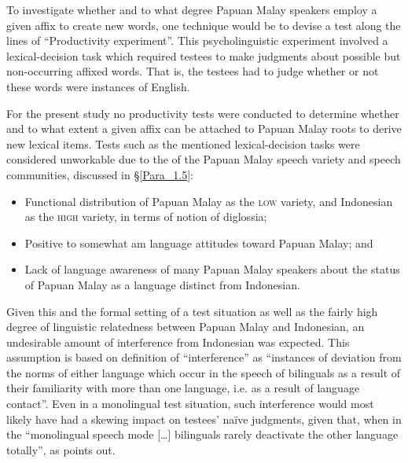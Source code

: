 To investigate whether and to what degree Papuan Malay speakers employ a given affix to create new words, one technique would be to devise a test along the lines of  “Productivity experiment”. This psycholinguistic experiment involved a lexical-decision task which required testees to make judgments about possible but non-occurring affixed words. That is, the testees had to judge whether or not these words were instances of English.



For the present study no productivity tests were conducted to determine whe\-ther and to what extent a given affix can be attached to Papuan Malay roots to derive new lexical items. Tests such as the mentioned lexical-decision tasks were considered unworkable due to the  of the Papuan Malay speech variety and speech communities, discussed in §\ref{Para_1.5}:


\begin{itemize}
\item 
Functional distribution of Papuan Malay as the \textsc{low} variety, and Indonesian as the \textsc{high} variety, in terms of  notion of diglossia;

\item 
Positive to somewhat am language attitudes toward Papuan Malay; and

\item 
Lack of language awareness of many Papuan Malay speakers about the status of Papuan Malay as a language distinct from Indonesian.

\end{itemize}

Given this  and the formal setting of a test situation as well as the fairly high degree of linguistic relatedness between Papuan Malay and Indonesian, an undesirable amount of interference from Indonesian was expected. This assumption is based on  definition of “interference” as “instances of deviation from the norms of either language which occur in the speech of bilinguals as a result of their familiarity with more than one language, i.e. as a result of language contact”. Even in a monolingual test situation, such interference would most likely have had a skewing impact on testees’ naïve judgments, given that, when in the “monolingual speech mode [\ldots] bilinguals rarely deactivate the other language totally”, as \citet[59]{Grosjean.1992} points out.



